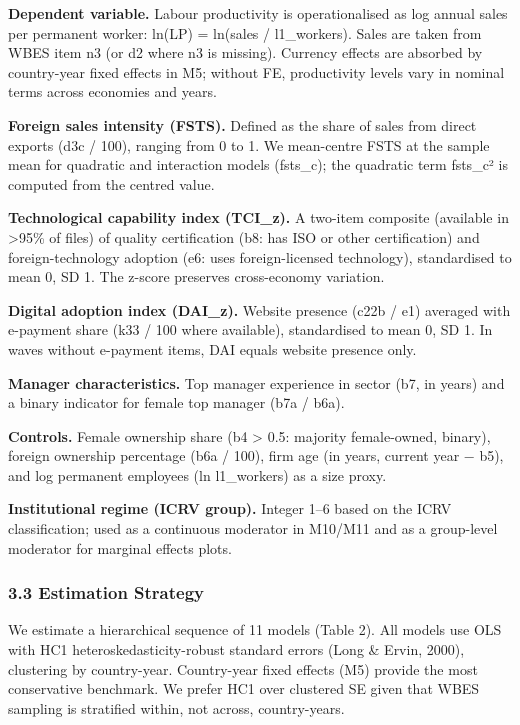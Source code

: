 \documentclass[12pt,a4paper]{article}
\begin{document}
\textbf{Dependent variable.} Labour productivity is operationalised as
log annual sales per permanent worker: ln(LP) = ln(sales / l1\_workers).
Sales are taken from WBES item n3 (or d2 where n3 is missing). Currency
effects are absorbed by country-year fixed effects in M5; without FE,
productivity levels vary in nominal terms across economies and years.

\textbf{Foreign sales intensity (FSTS).} Defined as the share of sales
from direct exports (d3c / 100), ranging from 0 to 1. We mean-centre
FSTS at the sample mean for quadratic and interaction models (fsts\_c);
the quadratic term fsts\_c² is computed from the centred value.

\textbf{Technological capability index (TCI\_z).} A two-item composite
(available in \textgreater95\% of files) of quality certification (b8:
has ISO or other certification) and foreign-technology adoption (e6:
uses foreign-licensed technology), standardised to mean 0, SD 1. The
z-score preserves cross-economy variation.

\textbf{Digital adoption index (DAI\_z).} Website presence (c22b / e1)
averaged with e-payment share (k33 / 100 where available), standardised
to mean 0, SD 1. In waves without e-payment items, DAI equals website
presence only.

\textbf{Manager characteristics.} Top manager experience in sector (b7,
in years) and a binary indicator for female top manager (b7a / b6a).

\textbf{Controls.} Female ownership share (b4 \textgreater{} 0.5:
majority female-owned, binary), foreign ownership percentage (b6a /
100), firm age (in years, current year − b5), and log permanent
employees (ln l1\_workers) as a size proxy.

\textbf{Institutional regime (ICRV group).} Integer 1--6 based on the
ICRV classification; used as a continuous moderator in M10/M11 and as a
group-level moderator for marginal effects plots.

\hypertarget{33-estimation-strategy}{%
\subsubsection{3.3 Estimation Strategy}\label{33-estimation-strategy}}

We estimate a hierarchical sequence of 11 models (Table 2). All models
use OLS with HC1 heteroskedasticity-robust standard errors (Long \&
Ervin, 2000), clustering by country-year. Country-year fixed effects
(M5) provide the most conservative benchmark. We prefer HC1 over
clustered SE given that WBES sampling is stratified within, not across,
country-years.
\end{document}
